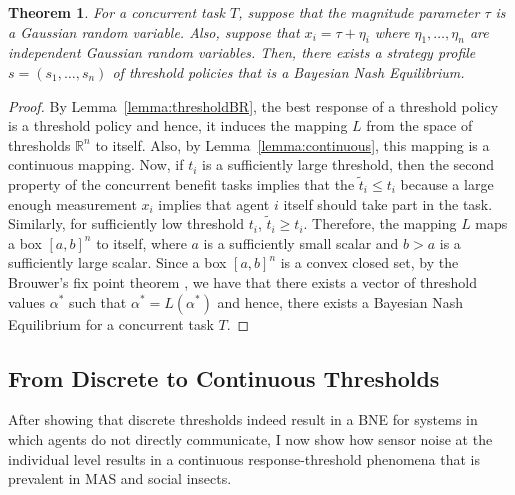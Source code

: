 \documentclass[defaultstyle,12pt]{proposal}
\newtheorem{theorem}{Theorem}
\def\R{\mathbb{R}}    %
\begin{document}
\begin{theorem}\label{thrm:mainthrm}
For a concurrent task $T$, suppose that the magnitude parameter $\tau$ is a Gaussian random variable. Also, suppose that $x_i=\tau+\eta_i$ where $\eta_1,\ldots,\eta_n$ are independent Gaussian random variables. Then, there exists a strategy profile $s=(s_1,\ldots,s_n)$ of threshold policies that is a Bayesian Nash Equilibrium.
\end{theorem}
\begin{proof}
By Lemma~\ref{lemma:thresholdBR}, the best response of a threshold policy is a threshold policy and hence, it induces the mapping $L$ from the space of thresholds $\R^n$ to itself. Also, by Lemma~\ref{lemma:continuous}, this mapping is a continuous mapping. Now, if $t_i$ is a sufficiently large threshold, then the second property of the concurrent benefit tasks implies that the $\tilde{t}_i\leq t_i$ because a large enough measurement $x_i$ implies that agent $i$ itself should take part in the task. Similarly, for sufficiently low threshold $t_i$, $\tilde{t}_i\geq t_i$. Therefore, the mapping $L$ maps a box $[a,b]^n$ to itself, where $a$ is a sufficiently small scalar and $b>a$ is a sufficiently large scalar. Since a box $[a,b]^n$ is a convex closed set, by the Brouwer's fix point theorem \cite{Border1990}, we have that there exists a vector of threshold values $\alpha^*$ such that $\alpha^*=L(\alpha^*)$ and hence, there exists a Bayesian Nash Equilibrium for a concurrent task $T$.
\end{proof}


\subsection{From Discrete to Continuous Thresholds}\label{subsec:sigfun}
After showing that discrete thresholds indeed result in a BNE for systems in which agents do not directly communicate, I  now show how sensor noise at the individual level results in a continuous response-threshold phenomena that is prevalent in MAS and social insects. 
\end{document}
